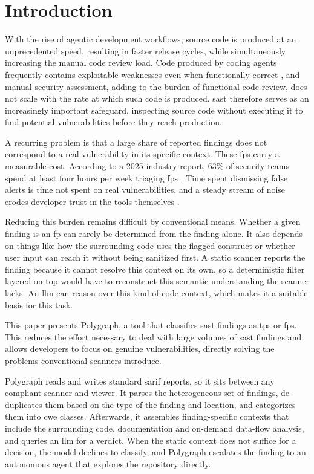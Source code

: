 \section{Introduction}

With the rise of agentic development workflows, source code is produced at an unprecedented speed, resulting in faster release cycles, while simultaneously increasing the manual code review load.
Code produced by coding agents frequently contains exploitable weaknesses even when functionally correct \cite{vero2025}, and manual security assessment, adding to the burden of functional code review, does not scale with the rate at which such code is produced. \ac{sast} therefore serves as an increasingly important safeguard, inspecting source code without executing it to find potential vulnerabilities before they reach production.

A recurring problem is that a
large share of reported findings does not correspond to a real vulnerability in
its specific context. These \acp{fp} carry a measurable cost. According to a 2025
industry report, 63\% of security teams spend at least four hours per week
triaging \acp{fp} \cite{nash2025falsepositive}. Time spent dismissing
false alerts is time not spent on real vulnerabilities, and a steady stream
of noise erodes developer trust in the tools themselves \cite{johnson2013why}.

Reducing this burden remains difficult by conventional means. Whether a given
finding is an \ac{fp} can rarely be determined from the finding alone. It
also depends on things like how the surrounding code uses the flagged construct or whether
user input can reach it without being sanitized first. A static scanner reports
the finding because it cannot resolve this context on its own, so a
deterministic filter layered on top would have to reconstruct this semantic
understanding the scanner lacks. An \ac{llm} can reason over
this kind of code context, which makes it a suitable basis for this task.

This paper presents Polygraph, a tool that classifies \ac{sast} findings as \acp{tp} or \acp{fp}. This reduces the effort necessary to deal with large volumes of \ac{sast} findings and allows developers to focus on genuine vulnerabilities, directly solving the problems conventional scanners introduce.

Polygraph reads and writes standard \ac{sarif} reports, so it sits between any
compliant scanner and viewer. It parses the heterogeneous set of findings, de-duplicates them based on the type of the finding and location, and categorizes them into \ac{cwe} classes.
Afterwards, it assembles finding-specific contexts that include the surrounding code, documentation and on-demand data-flow analysis, and queries an \ac{llm} for a
verdict. When the static context does not suffice for a decision, the model
declines to classify, and Polygraph escalates the finding to
an autonomous agent that explores the repository directly.

